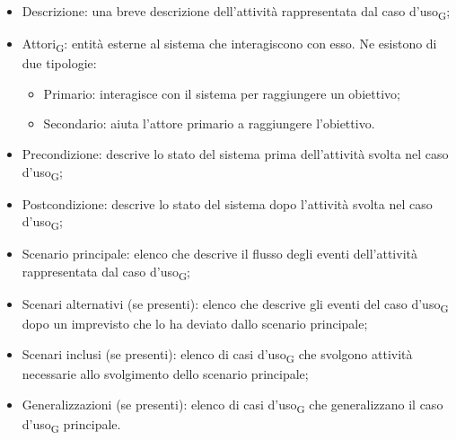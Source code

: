 	\begin{itemize}
		\item Descrizione: una breve descrizione dell'attività rappresentata dal caso d'uso\textsubscript{G};
		\item Attori\textsubscript{G}: entità esterne al sistema che interagiscono con esso. Ne esistono di due tipologie:
		\begin{itemize}
			\item Primario: interagisce con il sistema per raggiungere un obiettivo;
			\item Secondario: aiuta l'attore primario a raggiungere l'obiettivo.
		\end{itemize}
		\item Precondizione: descrive lo stato del sistema prima dell'attività svolta nel caso d'uso\textsubscript{G};
		\item Postcondizione: descrive lo stato del sistema dopo l'attività svolta nel caso d'uso\textsubscript{G};
		\item Scenario principale: elenco che descrive il flusso degli eventi dell'attività rappresentata dal caso d'uso\textsubscript{G};
		\item Scenari alternativi (se presenti): elenco che descrive gli eventi del caso d'uso\textsubscript{G} dopo un imprevisto che lo ha deviato dallo scenario principale;
		\item Scenari inclusi (se presenti): elenco di casi d'uso\textsubscript{G} che svolgono attività necessarie allo svolgimento dello scenario principale;
		\item Generalizzazioni (se presenti): elenco di casi d'uso\textsubscript{G} che generalizzano il caso d'uso\textsubscript{G} principale.
	\end{itemize}
    
